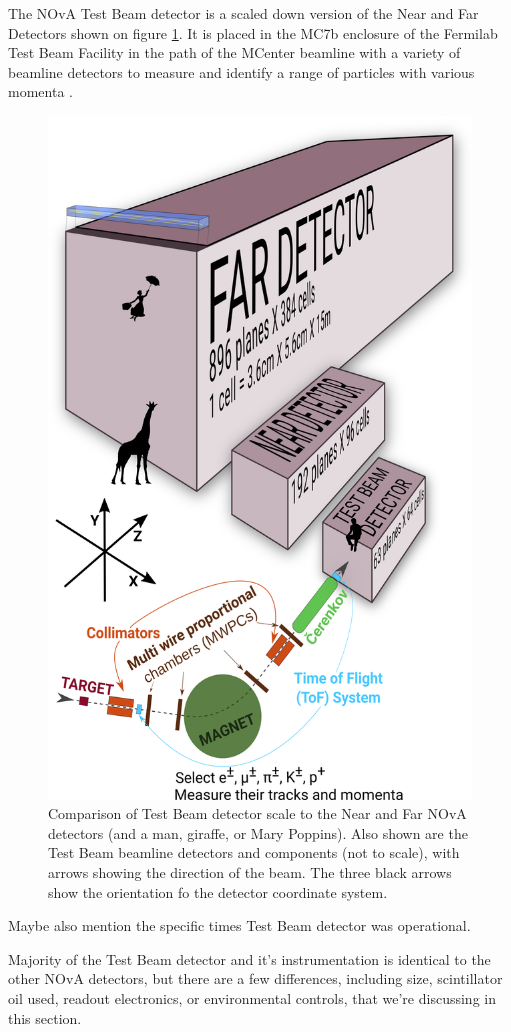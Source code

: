 \documentclass[12pt,a4paper]{article}
\begin{document}
The NOvA Test Beam detector is a scaled down version of the Near and Far Detectors shown on figure \ref{figTBDetector}. It is placed in the MC7b enclosure of the Fermilab Test Beam Facility in the path of the MCenter beamline with a variety of beamline detectors to measure and identify a range of particles with various momenta \cite{NOVA-doc-22172-v2}.

\begin{figure}[!ht]
\centering
\includegraphics[width=.7\textwidth]{Plots/TestBeamDetectorWithArrows.png}
\caption{Comparison of Test Beam detector scale to the Near and Far NOvA detectors (and a man, giraffe, or Mary Poppins). Also shown are the Test Beam beamline detectors and components (not to scale), with arrows showing the direction of the beam. The three black arrows show the orientation fo the detector coordinate system.}
\label{figTBDetector}
\end{figure}

Maybe also mention the specific times Test Beam detector was operational.

Majority of the Test Beam detector and it's instrumentation is identical to the other NOvA detectors, but there are a few differences, including size, scintillator oil used, readout electronics, or environmental controls, that we're discussing in this section.
\end{document}
